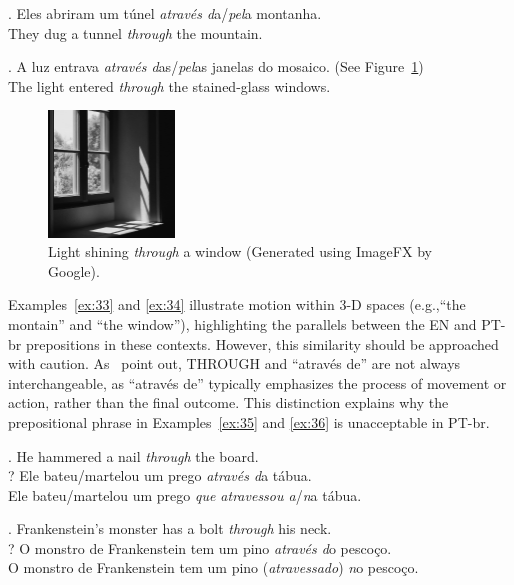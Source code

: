 {{\ex. Eles abriram um túnel \emph{através d}a/\emph{pel}a montanha. \label{ex:33}   \\
     They dug a tunnel \emph{through} the mountain.
      
\ex. A luz entrava \emph{através d}as/\emph{pel}as janelas do mosaico. (See Figure~\ref{fig:window})  \label{ex:34}  \\  
    The light entered \emph{through} the stained-glass windows. 

\begin{figure}[ht]
    \centering
    \includegraphics[width=0.3\textwidth]{textual/Figuras/image_fx_light_shining_through_a_window_black_and_whit.jpg}
    \caption{Light shining \emph{through} a window (Generated using ImageFX by Google).}
    \label{fig:window}
\end{figure}


Examples~\ref{ex:33} and \ref{ex:34} illustrate motion within 3-D spaces (e.g.,``the montain'' and ``the window''), highlighting the parallels between the EN and PT-br prepositions in these contexts. However, this similarity should be approached with caution. As~\textcite{McCleary-Viotti-2004} point out, THROUGH and ``através de'' are not always interchangeable, as ``através de'' typically emphasizes the process of movement or action, rather than the final outcome. This distinction explains why the prepositional phrase in Examples~\ref{ex:35} and \ref{ex:36} is unacceptable in PT-br.

\ex. He hammered a nail \emph{through} the board. \label{ex:35}   \\
     ? Ele bateu/martelou um prego \emph{através d}a tábua. \\
     Ele bateu/martelou um prego \emph{que atravessou a}/\emph{n}a tábua.

\ex. Frankenstein's monster has a bolt \emph{through} his neck. \label{ex:36}   \\
     ? O monstro de Frankenstein tem um pino \emph{através d}o pescoço. \\
     O monstro de Frankenstein tem um pino (\emph{atravessado}) \emph{n}o pescoço.

}}
